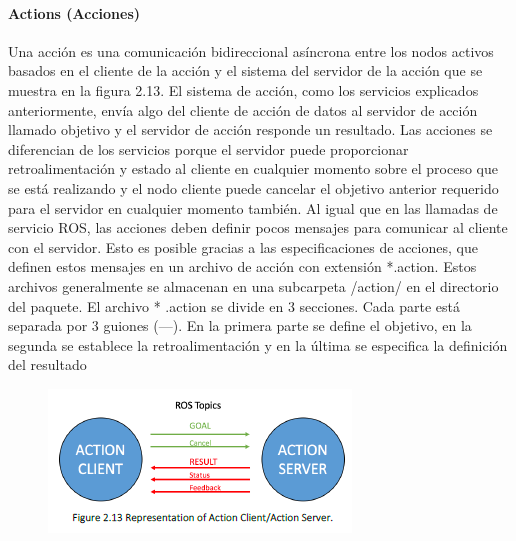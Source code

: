                \newpage

            \paragraph{ Actions (Acciones)}
                    Una acción es una comunicación bidireccional asíncrona entre los nodos activos basados en el cliente de la acción y el sistema del servidor de la acción que se muestra en la figura 2.13. El sistema de acción, como los servicios explicados anteriormente, envía algo del cliente de acción de datos al servidor de acción llamado objetivo y el servidor de acción responde un resultado. Las acciones se diferencian de los servicios porque el servidor puede proporcionar retroalimentación y estado al cliente en cualquier momento sobre el proceso que se está realizando y el nodo cliente puede cancelar el objetivo anterior requerido para el servidor en cualquier momento también.
                    Al igual que en las llamadas de servicio ROS, las acciones deben definir pocos mensajes para comunicar al cliente con el servidor. Esto es posible gracias a las especificaciones de acciones, que definen estos mensajes en un archivo de acción con extensión *.action. Estos archivos generalmente se almacenan en una subcarpeta /action/ en el directorio del paquete.
                    El archivo * .action se divide en 3 secciones. Cada parte está separada por 3 guiones (---). En la primera parte se define el objetivo, en la segunda se establece la retroalimentación y en la última se especifica la definición del resultado

            \begin{figure}[htb]
                \centering
                \includegraphics[width=1.0\linewidth]{Main/Chapter3/Images3/n_s_a_11.png}
                \caption{}
                \label{f:Cap3_conceptos_11}
            \end{figure}             

